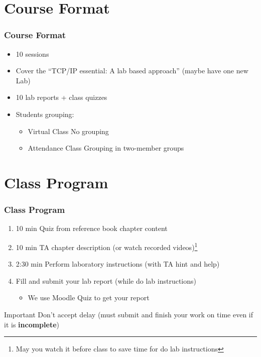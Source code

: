 \documentclass[aspectratio=169,15pt]{beamer}
\begin{document}
\section{Course Format}
\begin{frame}
    \frametitle{Course Format}

    \begin{itemize}
        \item 10 sessions
        \item Cover the “TCP/IP essential: A lab based approach” (maybe have one new Lab)
        \item 10 lab reports + class quizzes
        \item Students grouping:
        \begin{itemize}
            \item \alert{Virtual Class} No grouping
            \item \alert{Attendance Class} Grouping in two-member groups
        \end{itemize}
    \end{itemize}
    
\end{frame}

\section{Class Program}
\begin{frame}
    \frametitle{Class Program}
    
    \begin{enumerate}
        \item \alert{10 min} Quiz from reference book chapter content
        \item \alert{10 min} TA chapter description (or watch recorded videos)\footnote{May you watch it before class to save time for do lab instructions}
        \item \alert{2:30 min} Perform laboratory instructions (with TA hint and help)
        \item Fill and submit your lab report (while do lab instructions)
        \begin{itemize}
            \item We use Moodle Quiz to get your report
        \end{itemize}
    \end{enumerate}
    \begin{alertblock}{Important}
        Don’t accept delay (must submit and finish your work on time even if it is \textbf{incomplete})
    \end{alertblock}

\end{frame}
\end{document}
